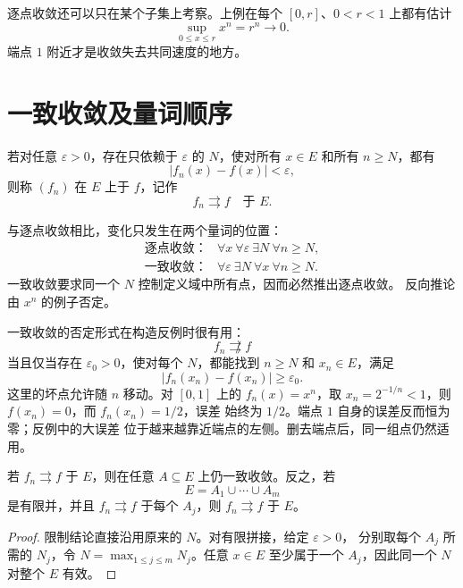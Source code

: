 逐点收敛还可以只在某个子集上考察。上例在每个 \([0,r]\)、\(0<r<1\)
上都有估计
\[
 \sup_{0\le x\le r}x^n=r^n\to0.
\]
端点 \(1\) 附近才是收敛失去共同速度的地方。

\section{一致收敛及量词顺序}

\begin{definition}[一致收敛]
若对任意 \(\varepsilon>0\)，存在只依赖于 \(\varepsilon\) 的
\(N\)，使对所有 \(x\in E\) 和所有 \(n\ge N\)，都有
\[
 |f_n(x)-f(x)|<\varepsilon,
\]
则称 \((f_n)\) 在 \(E\) 上于 \(f\)，记作
\[
 f_n\rightrightarrows f\quad\text{于 }E.
\]
\end{definition}

与逐点收敛相比，变化只发生在两个量词的位置：
\[
\begin{array}{ll}
\text{逐点收敛：}&
 \forall x\ \forall\varepsilon\ \exists N\ \forall n\ge N,\\[0.3em]
\text{一致收敛：}&
 \forall\varepsilon\ \exists N\ \forall x\ \forall n\ge N.
\end{array}
\]
一致收敛要求同一个 \(N\) 控制定义域中所有点，因而必然推出逐点收敛。
反向推论由 \(x^n\) 的例子否定。

一致收敛的否定形式在构造反例时很有用：
\[
 f_n\not\rightrightarrows f
\]
当且仅当存在 \(\varepsilon_0>0\)，使对每个 \(N\)，都能找到
\(n\ge N\) 和 \(x_n\in E\)，满足
\[
 |f_n(x_n)-f(x_n)|\ge\varepsilon_0.
\]
这里的坏点允许随 \(n\) 移动。对 \([0,1]\) 上的 \(f_n(x)=x^n\)，取
\(x_n=2^{-1/n}<1\)，则 \(f(x_n)=0\)，而 \(f_n(x_n)=1/2\)，误差
始终为 \(1/2\)。端点 \(1\) 自身的误差反而恒为零；反例中的大误差
位于越来越靠近端点的左侧。删去端点后，同一组点仍然适用。

\begin{proposition}[一致收敛的限制与有限拼接]
若 \(f_n\rightrightarrows f\) 于 \(E\)，则在任意 \(A\subseteq E\)
上仍一致收敛。反之，若
\[
 E=A_1\cup\cdots\cup A_m
\]
是有限并，并且 \(f_n\rightrightarrows f\) 于每个 \(A_j\)，则
\(f_n\rightrightarrows f\) 于 \(E\)。
\end{proposition}

\begin{proof}
限制结论直接沿用原来的 \(N\)。对有限拼接，给定 \(\varepsilon>0\)，
分别取每个 \(A_j\) 所需的 \(N_j\)，令
\(N=\max_{1\le j\le m}N_j\)。任意 \(x\in E\) 至少属于一个
\(A_j\)，因此同一个 \(N\) 对整个 \(E\) 有效。
\end{proof}

